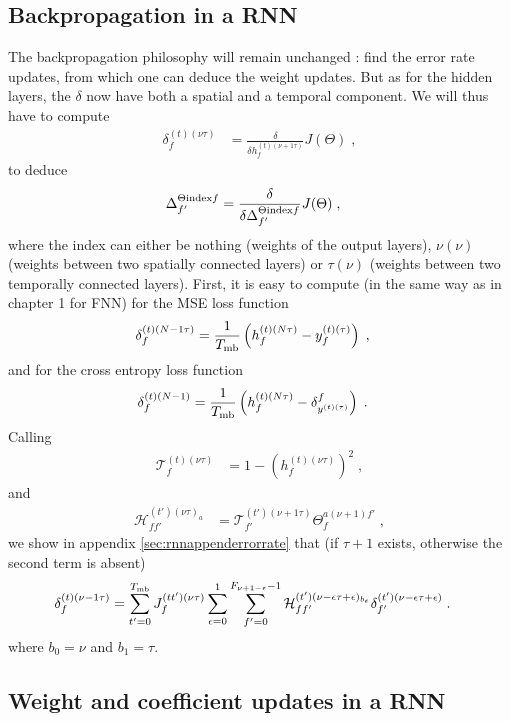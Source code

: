 \subsection{Backpropagation in a RNN}

The backpropagation philosophy will remain unchanged : find the error rate updates, from which one can deduce the weight updates. But as for the hidden layers, the $\delta$ now have both a spatial and a temporal component. We will thus have to compute
\begin{align}
\delta^{(t)( \nu\tau)}_f&=\frac{\delta}{\delta h^{(t)( \nu+1\tau)}_f }J(\Theta)\;,
\end{align}
to deduce
\begin{align}
\Delta^{\Theta{\rm index}f}_{f'}&=\frac{\delta}{\delta \Delta^{\Theta{\rm index}f}_{f'} }J(\Theta)\;,
\end{align}
where the index can either be nothing (weights of the output layers), $\nu(\nu)$ (weights between two spatially connected layers) or $\tau(\nu)$ (weights between two temporally connected layers). First, it is easy to compute (in the same way as in chapter 1 for FNN) for the MSE loss function
\begin{align}
\delta^{(t)(N-1\tau)}_f&= \frac{1}{T_{{\rm mb}}}\left(h_{f}^{(t)(N\tau)}-y_f^{(t)(\tau)}\right)\;,
\end{align}
and for the cross entropy loss function
\begin{align}
\delta^{(t)(N-1)}_{f}&= \frac{1}{T_{{\rm mb}}}\left(h_{f}^{(t)(N\tau)}-\delta^f_{y^{(t)(\tau)}}\right)\;.
\end{align}
Calling
\begin{align}
\mathcal{T}_{f}^{(t)(\nu\tau)}&=1-\left(h_{f}^{(t)(\nu\tau)}\right)^2\;,
\end{align}
and
\begin{align}
\mathcal{H}^{(t')(\nu\tau)_a}_{ff'}&=\mathcal{T}^{(t')(\nu+1\tau)}_{f'}\Theta^{a(\nu+1)f'}_{f}\;,
\end{align}
we show in appendix \ref{sec:rnnappenderrorrate} that (if $\tau+1$ exists, otherwise the second term is absent)
\begin{align}
\delta^{(t)(\nu-1\tau)}_f&=
%
\sum_{t'=0}^{T_{{\rm mb}}}J^{(tt')(\nu\tau)}_f\sum_{\epsilon=0}^{1}\sum_{f'=0}^{F_{\nu+1-\epsilon}-1}
%
\mathcal{H}^{(t')(\nu-\epsilon\tau+\epsilon)_{b_\epsilon}}_{ff'}\delta^{(t')(\nu-\epsilon\tau+\epsilon)}_{f'}\;.
\end{align}
where $b_0=\nu$ and $b_1=\tau$.

\subsection{Weight and coefficient updates in a RNN}

